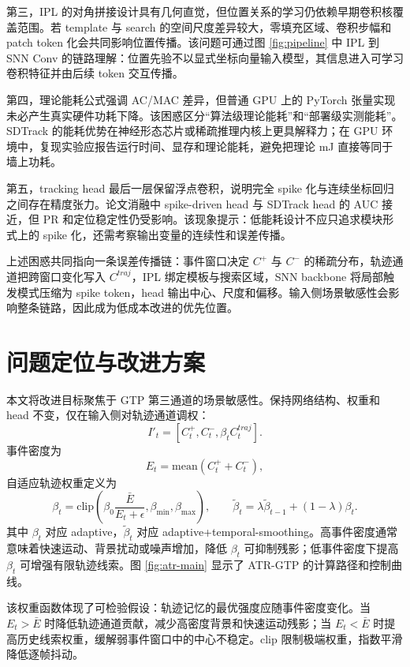 \documentclass[UTF8,a4paper,zihao=-4]{ctexart}
\begin{document}
第三，IPL 的对角拼接设计具有几何直觉，但位置关系的学习仍依赖早期卷积核覆盖范围。若 template 与 search 的空间尺度差异较大，零填充区域、卷积步幅和 patch token 化会共同影响位置传播。该问题可通过图 \ref{fig:pipeline} 中 IPL 到 SNN Conv 的链路理解：位置先验不以显式坐标向量输入模型，其信息进入可学习卷积特征并由后续 token 交互传播。

第四，理论能耗公式强调 AC/MAC 差异，但普通 GPU 上的 PyTorch 张量实现未必产生真实硬件功耗下降。该困惑区分“算法级理论能耗”和“部署级实测能耗”。SDTrack 的能耗优势在神经形态芯片或稀疏推理内核上更具解释力；在 GPU 环境中，复现实验应报告运行时间、显存和理论能耗，避免把理论 mJ 直接等同于墙上功耗。

第五，tracking head 最后一层保留浮点卷积，说明完全 spike 化与连续坐标回归之间存在精度张力。论文消融中 spike-driven head 与 SDTrack head 的 AUC 接近，但 PR 和定位稳定性仍受影响。该现象提示：低能耗设计不应只追求模块形式上的 spike 化，还需考察输出变量的连续性和误差传播。

上述困惑共同指向一条误差传播链：事件窗口决定 $C^+$ 与 $C^-$ 的稀疏分布，轨迹通道把跨窗口变化写入 $C^{traj}$，IPL 绑定模板与搜索区域，SNN backbone 将局部触发模式压缩为 spike token，head 输出中心、尺度和偏移。输入侧场景敏感性会影响整条链路，因此成为低成本改进的优先位置。

\section{问题定位与改进方案}
本文将改进目标聚焦于 GTP 第三通道的场景敏感性。保持网络结构、权重和 head 不变，仅在输入侧对轨迹通道调权：
\begin{equation}
I'_t=[C_t^+,C_t^-,\beta_t C_t^{traj}].
\end{equation}
事件密度为
\begin{equation}
E_t=\mathrm{mean}(C_t^++C_t^-),
\end{equation}
自适应轨迹权重定义为
\begin{equation}
\beta_t=\mathrm{clip}\left(\beta_0\frac{\bar E}{E_t+\epsilon},\beta_{\min},\beta_{\max}\right),
\qquad
\tilde{\beta}_t=\lambda\tilde{\beta}_{t-1}+(1-\lambda)\beta_t.
\end{equation}
其中 $\beta_t$ 对应 adaptive，$\tilde{\beta}_t$ 对应 adaptive+temporal-smoothing。高事件密度通常意味着快速运动、背景扰动或噪声增加，降低 $\beta_t$ 可抑制残影；低事件密度下提高 $\beta_t$ 可增强有限轨迹线索。图 \ref{fig:atr-main} 显示了 ATR-GTP 的计算路径和控制曲线。

该权重函数体现了可检验假设：轨迹记忆的最优强度应随事件密度变化。当 $E_t>\bar E$ 时降低轨迹通道贡献，减少高密度背景和快速运动残影；当 $E_t<\bar E$ 时提高历史线索权重，缓解弱事件窗口中的中心不稳定。clip 限制极端权重，指数平滑降低逐帧抖动。
\end{document}
